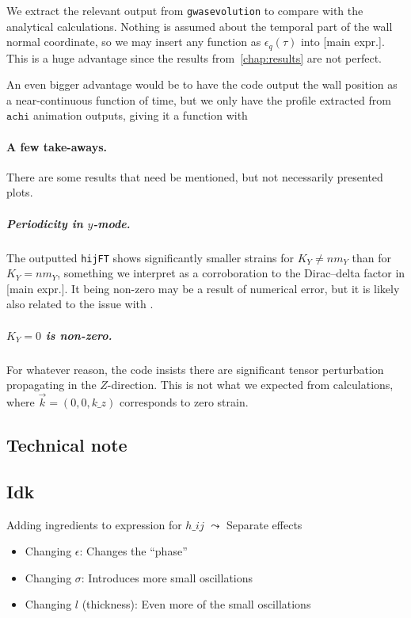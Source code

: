     We extract the relevant output from \texttt{gwasevolution} to compare with the analytical calculations. Nothing is assumed about the temporal part of the wall normal coordinate, so we may insert any function as $\epsilon_q(\tau)$ into [main expr.]. This is a huge advantage since the results from~\cref{chap:results} are not perfect. 
    
    An even bigger advantage would be to have the code output the wall position as a near-continuous function of time, but we only have the profile extracted from $\mathtt{achi}$ animation outputs, giving it a function with \blahblah


    \paragraph{A few take-aways.} %
    There are some results that need be mentioned, but not necessarily presented plots. 
    \subparagraph{Periodicity in $y$-mode.} %
    The outputted \texttt{hijFT} shows significantly smaller strains for $K_Y\neq n m_Y$ than for $K_Y = n m_Y$, something we interpret as a corroboration to the Dirac--delta factor in [main expr.]. It being non-zero may be a result of numerical error, but it is likely also related to the issue with . 
    \subparagraph{$K_Y=0$ is non-zero.} %
    For whatever reason, the code insists there are significant tensor perturbation propagating in the $Z$-direction. This is not what we expected from calculations, where $\vec{k}=(0,0,k\_{z})$ corresponds to zero strain.


\subsection{Technical note}



\subsection{Idk}
    



\begin{bullets}
    \item Adding ingredients to expression for $h\_{ij}$ $\leadsto$ Separate effects %
    \begin{itemize}
        \item Changing $\epsilon$: Changes the ``phase'' 
        \item Changing $\sigma$: Introduces more small oscillations
        \item Changing $l$ (thickness): Even more of the small oscillations
    \end{itemize}
    \item 
\end{bullets}